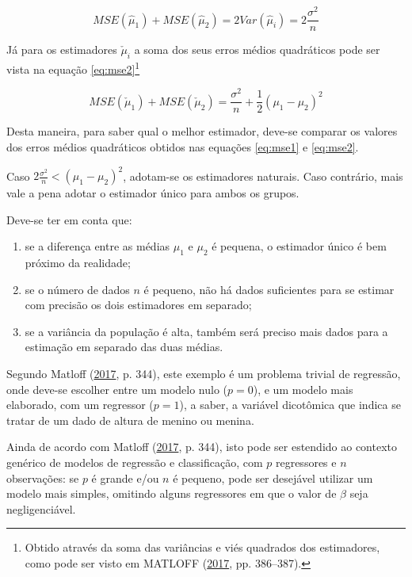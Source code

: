 \documentclass[
  a4paper, 11pt]{article}
\providecommand{\tightlist}{%
  \setlength{\itemsep}{0pt}\setlength{\parskip}{0pt}}
\begin{document}
\begin{equation} \label{eq:mse1}
MSE(\hat\mu_1) + MSE(\hat\mu_2) = 2 Var(\hat \mu_i) = 2 \frac{\sigma^2}{n}
\end{equation}

Já para os estimadores \(\check \mu_i\) a soma dos seus erros médios
quadráticos pode ser vista na equação \ref{eq:mse2}\footnote{Obtido
  através da soma das variâncias e viés quadrados dos estimadores, como
  pode ser visto em MATLOFF (\protect\hyperlink{ref-matloff2017}{2017},
  pp. 386--387).}

\begin{equation} \label{eq:mse2}
MSE(\check\mu_1) + MSE(\check\mu_2) = \frac{\sigma^2}{n} + \frac{1}{2}(\mu_1 - \mu_2)^2
\end{equation}

Desta maneira, para saber qual o melhor estimador, deve-se comparar os
valores dos erros médios quadráticos obtidos nas equações \ref{eq:mse1}
e \ref{eq:mse2}.

Caso \(2\frac{\sigma^2}{n} < (\mu_1-\mu_2)^2\), adotam-se os estimadores
naturais. Caso contrário, mais vale a pena adotar o estimador único para
ambos os grupos.

Deve-se ter em conta que:

\begin{enumerate}
\def\labelenumi{\arabic{enumi}.}
\tightlist
\item
  se a diferença entre as médias \(\mu_1\) e \(\mu_2\) é pequena, o
  estimador único é bem próximo da realidade;
\item
  se o número de dados \(n\) é pequeno, não há dados suficientes para se
  estimar com precisão os dois estimadores em separado;
\item
  se a variância da população é alta, também será preciso mais dados
  para a estimação em separado das duas médias.
\end{enumerate}

Segundo Matloff (\protect\hyperlink{ref-matloff2017}{2017}, p. 344),
este exemplo é um problema trivial de regressão, onde deve-se escolher
entre um modelo nulo (\(p = 0\)), e um modelo mais elaborado, com um
regressor (\(p = 1\)), a saber, a variável dicotômica que indica se
tratar de um dado de altura de menino ou menina.

Ainda de acordo com Matloff (\protect\hyperlink{ref-matloff2017}{2017},
p. 344), isto pode ser estendido ao contexto genérico de modelos de
regressão e classificação, com \(p\) regressores e \(n\) observações: se
\(p\) é grande e/ou \(n\) é pequeno, pode ser desejável utilizar um
modelo mais simples, omitindo alguns regressores em que o valor de
\(\beta\) seja negligenciável.
\end{document}
